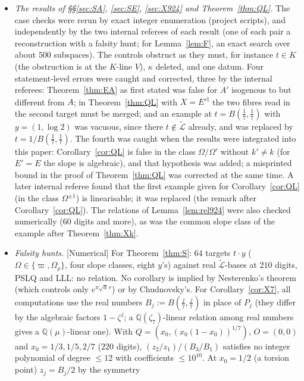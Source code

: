 \documentclass[11pt]{amsart}
\theoremstyle{definition}
\newcommand{\Q}{\mathbb{Q}}
\newcommand{\Lt}{\widetilde{\mathcal{L}}}
\newcommand{\vp}{\varpi}
\newcommand{\lab}[1]{\textup{[#1]}}
\begin{document}
\begin{itemize}
$s\in K$ (equality obstruction, as it must, since the strong statement is false at $t=2$); SMG$^\natural$ at $n=2$.
\item \emph{The results of \S\S\ref{sec:SA}, \ref{sec:SE}, \ref{sec:X924} and Theorem~\ref{thm:QL}.} The case checks were
rerun by exact integer enumeration (project scripts), and independently by the two internal referees of each result (one of
each pair a reconstruction with a falsity hunt; for Lemma~\ref{lem:F}, an exact search over about $500$ subspaces).
The controls obstruct as they must, for instance $t\in K$ (the obstruction is at the $K$-line $V$), $\kappa$ deleted, and
one datum. Four statement-level errors
were caught and corrected, three by the internal referees: Theorem~\ref{thm:EA} as first stated was false for $A'$ isogenous
to but different from $A$; in Theorem~\ref{thm:QL} with $X=E'^\natural$ the two fibres read in the second target must be
merged; and an example at $t=B(\frac17,\frac17)$ with $y=(1,\log2)$ was vacuous, since there $t\notin\Lt$ already, and was
replaced by $t=1/B(\frac17,\frac17)$. The fourth was caught when the results were integrated into this paper:
Corollary~\ref{cor:QL} is false in the class $\Omega/\Omega'$ without $k'\neq k$ (for $E'=E$ the slope is algebraic), and
that hypothesis was added; a misprinted bound in the proof of Theorem~\ref{thm:QL} was corrected at the same time. A
later internal referee found that the first example given for Corollary~\ref{cor:QL} (in the class $\Omega^{\pm1}$) is
linearisable; it was replaced (the remark after Corollary~\ref{cor:QL}). The relations of Lemma~\ref{lem:rel924} were also checked numerically ($60$ digits and more),
as was the common slope class of the example after Theorem~\ref{thm:Xk}.
\item \emph{Falsity hunts.} \lab{Numerical} For Theorem~\ref{thm:S}: $64$ targets $t\cdot y$ ($\Omega\in\{\vp,\Omega_\rho\}$, four slope
classes, eight $y$'s) against real $\Lt$-bases at $210$ digits, PSLQ and LLL: no relation. No corollary is implied by
Nesterenko's theorem (which controls only $e^{\pi\sqrt d\,r}$) or by Chudnovsky's. For Corollary~\ref{cor:X7}, all
computations use the real numbers $B_j:=B(\frac j7,\frac j7)$ in place of $P_j$ (they differ by the algebraic factors
$1-\zeta^j$; a $\Q(\zeta_7)$-linear relation among real numbers gives a $\Q(\mu)$-linear one). With
$Q=(x_0,(x_0(1-x_0))^{1/7})$, $O=(0,0)$ and $x_0=1/3,1/5,2/7$ ($220$ digits), $(z_2/z_1)/(B_3/B_1)$ satisfies no integer
polynomial of degree $\le12$ with coefficients $\le10^{10}$. At $x_0=1/2$ (a torsion point) $z_j=B_j/2$ by the symmetry

\end{itemize}
\end{document}
